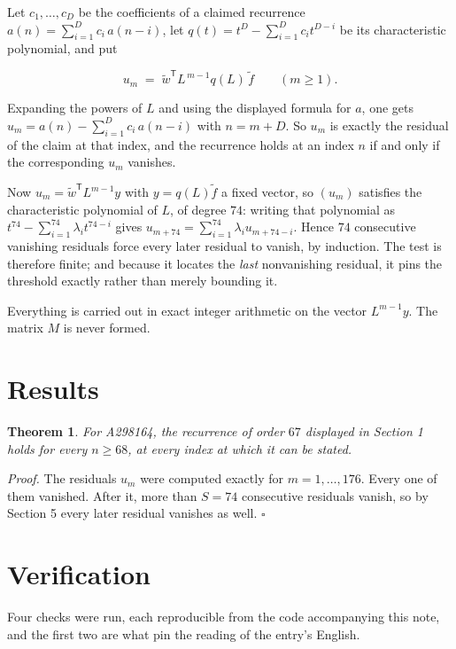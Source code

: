 \documentclass[11pt]{article}
\newtheorem{theorem}{Theorem}
\theoremstyle{definition}
\begin{document}
Let $c_1,\dots,c_D$ be the coefficients of a claimed recurrence $a(n) = \sum_{i=1}^{D} c_i\,a(n-i)$, let $q(t) = t^{D} - \sum_{i=1}^{D} c_i t^{D-i}$ be its characteristic polynomial, and put

\[u_m \;=\; \tilde w^{\mathsf T} L^{\,m-1} q(L)\,\tilde f \qquad (m \ge 1).\]

Expanding the powers of $L$ and using the displayed formula for $a$, one gets $u_m = a(n) - \sum_{i=1}^{D} c_i\,a(n-i)$ with $n = m + D$. So $u_m$ is exactly the residual of the claim at that index, and the recurrence holds at an index $n$ if and only if the corresponding $u_m$ vanishes.

Now $u_m = \tilde w^{\mathsf T} L^{m-1} y$ with $y = q(L)\tilde f$ a fixed vector, so $(u_m)$ satisfies the characteristic polynomial of $L$, of degree $74$: writing that polynomial as $t^{74} - \sum_{i=1}^{74} \lambda_i t^{74-i}$ gives $u_{m+74} = \sum_{i=1}^{74} \lambda_i u_{m+74-i}$. Hence $74$ consecutive vanishing residuals force every later residual to vanish, by induction. The test is therefore finite; and because it locates the {\itshape last} nonvanishing residual, it pins the threshold exactly rather than merely bounding it.

Everything is carried out in exact integer arithmetic on the vector $L^{m-1}y$. The matrix $M$ is never formed.

\section{Results}

\begin{theorem} For A298164, the recurrence of order $67$ displayed in Section 1 holds for every $n \ge 68$, at every index at which it can be stated.\end{theorem}

{\itshape Proof.} The residuals $u_m$ were computed exactly for $m = 1,\dots,176$. Every one of them vanished. After it, more than $S = 74$ consecutive residuals vanish, so by Section 5 every later residual vanishes as well. $\square$

\section{Verification}

Four checks were run, each reproducible from the code accompanying this note, and the first two are what pin the reading of the entry's English.
\end{document}
